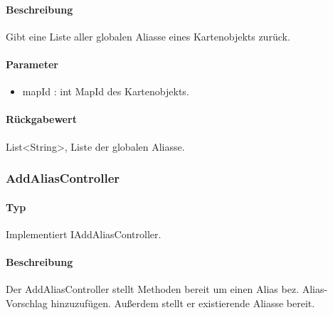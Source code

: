 \paragraph*{Beschreibung}
Gibt eine Liste aller globalen Aliasse eines Kartenobjekts zurück.
\paragraph*{Parameter}
\begin{itemize}
    \item mapId : int MapId des Kartenobjekts.
\end{itemize}
\paragraph*{Rückgabewert}
List<String>, Liste der globalen Aliasse.

\subsubsection{AddAliasController}
\paragraph*{Typ}
Implementiert IAddAliasController.
\paragraph*{Beschreibung}
Der AddAliasController stellt Methoden bereit um einen Alias bez. Alias-Vorschlag hinzuzufügen. 
Außerdem stellt er existierende Aliasse bereit.